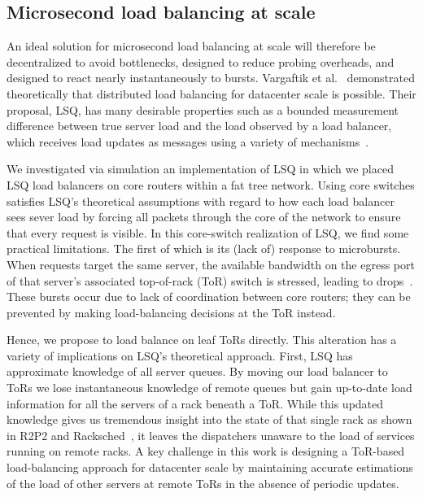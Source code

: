 \subsection{Microsecond load balancing at scale}

An ideal solution for microsecond load balancing at scale will therefore be
decentralized to avoid bottlenecks, designed to reduce probing overheads, and
designed to react nearly instantaneously to bursts.
Vargaftik et al.~\cite{lsq} demonstrated theoretically that distributed
load balancing for datacenter scale is possible. Their proposal, LSQ, has many
desirable properties such as a bounded measurement difference between true
server load and the load observed by a load balancer, which receives load
updates as messages using a variety of mechanisms~\cite{lsq}. 

We investigated via simulation an implementation of LSQ in which we
placed LSQ load balancers on core routers within a fat tree
network. Using core switches satisfies LSQ's theoretical assumptions
with regard to how each load balancer sees sever load by forcing all
packets through the core of the network to ensure that every request
is visible.  In this core-switch realization of LSQ, we find some
practical limitations.  The first of which is its (lack of) response
to microbursts. When requests target the same server, the available
bandwidth on the egress port of that server's associated top-of-rack
(ToR) switch is stressed, leading to drops~\cite{facebook_microburst}. These bursts
occur due to lack of coordination between core routers; they can be
prevented by making load-balancing decisions at the ToR instead.

Hence, we propose to load balance on leaf ToRs directly. This
alteration has a variety of implications on LSQ's theoretical
approach. First, LSQ has approximate knowledge of all server
queues. By moving our load balancer to ToRs we lose instantaneous
knowledge of remote queues but gain up-to-date load information for
all the servers of a rack beneath a ToR.  
%
While this updated knowledge gives us tremendous insight into the state of that single
rack as shown in R2P2 and Racksched~\cite{r2p2, racksched}, it leaves the
dispatchers unaware to the load of services running on remote racks.
A key challenge in this work is designing a ToR-based load-balancing
approach for datacenter scale by maintaining accurate estimations of
the load of other servers at remote ToRs in the absence of periodic updates. 

